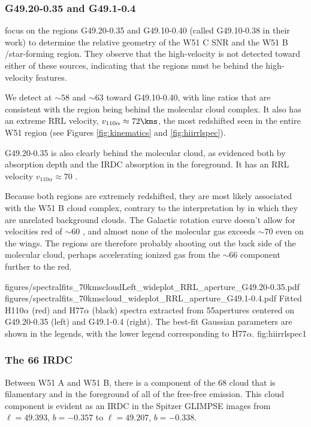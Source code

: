 \subsubsection{G49.20-0.35 and G49.1-0.4}
\citet{Tian2013a} focus on the \hii regions G49.20-0.35 and G49.10-0.40 (called
G49.10-0.38 in their work) to determine the relative geometry
of the W51 C SNR and the W51 B \hii/star-forming region.  They observe that the
high-velocity \hi is not detected toward either of these sources, indicating
that the \hii regions must be behind the high-velocity \hi features.

We detect \formaldehyde \oneone at $\sim58$ and $\sim63$ \kms toward
G49.10-0.40, with line ratios that are consistent with the \hii region being
behind the molecular cloud complex.  It also has an extreme RRL velocity,
$v_{110\alpha} \approx 72\kms$, the most redshifted seen in the entire W51 region
(see Figures \ref{fig:kinematics} and \ref{fig:hiirrlspec}).

G49.20-0.35 is also clearly behind the molecular cloud, as evidenced both by
\formaldehyde absorption depth and the IRDC absorption in the foreground.
It has an RRL velocity $v_{110\alpha} \approx 70$ \kms.

Because both \hii regions are extremely redshifted, they are most likely
associated with the W51 B cloud complex, contrary to the interpretation by
\citet{Tian2013a} in which they are unrelated background clouds.  The Galactic
rotation curve doesn't allow for velocities red of $\sim60$ \kms, and almost
none of the molecular gas exceeds $\sim70$ \kms even on the wings.  The \hii
regions are therefore probably shooting out the back side of the molecular
cloud, perhaps accelerating ionized gas from the $\sim 66$ \kms component
further to the red.

\FigureTwo
{figures/spectralfits_70kmscloudLeft_wideplot_RRL_aperture_G49.20-0.35.pdf}
{figures/spectralfits_70kmscloud_wideplot_RRL_aperture_G49.1-0.4.pdf}
{Fitted H110$\alpha$ (red) and H77$\alpha$ (black) spectra extracted from
55\arcsec apertures centered on G49.20-0.35 (left) and G49.1-0.4 (right).
The best-fit Gaussian parameters are shown in the legends, with the lower
legend corresponding to H77$\alpha$.}
{fig:hiirrlspec}{1}

\subsubsection{The 66 \kms IRDC}
Between W51 A and W51 B, there is a component of the 68 \kms cloud that is
filamentary and in the foreground of all of the free-free emission.
This cloud component is evident as an IRDC in the Spitzer GLIMPSE images from
$\ell=49.393$, $b=-0.357$ to $\ell=49.207$, $b=-0.338$.


